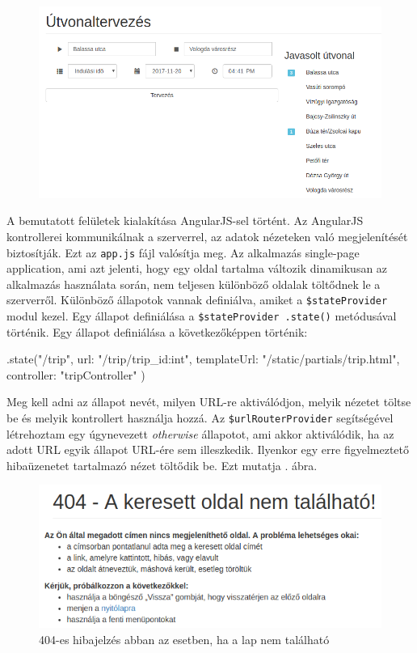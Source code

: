 \begin{figure}[h!]
\centering
\includegraphics[scale=0.5]{kepek/trip_planner.png}
\caption{}
\label{fig:trip_planner}
\end{figure}


A bemutatott felületek kialakítása AngularJS-sel történt. Az AngularJS kontrollerei kommunikálnak a szerverrel, az adatok nézeteken való megjelenítését biztosítják. Ezt az \texttt{app.js} fájl valósítja meg.
Az alkalmazás single-page application, ami azt jelenti, hogy egy oldal tartalma változik dinamikusan az alkalmazás használata során, nem teljesen különböző oldalak töltődnek le a szerverről. Különböző állapotok vannak definiálva, amiket a \texttt{\$stateProvider} modul kezel. Egy állapot definiálása a \texttt{\$stateProvider .state()} metódusával történik.
Egy állapot definiálása a következőképpen történik:
\begin{cpp}
.state("/trip", {
            url: "/trip/{trip_id:int}",
            templateUrl: "/static/partials/trip.html",
            controller: "tripController"
        })
\end{cpp}
Meg kell adni az állapot nevét, milyen URL-re aktiválódjon, melyik nézetet töltse be és melyik kontrollert használja hozzá.
Az \texttt{\$urlRouterProvider} segítségével létrehoztam egy úgynevezett \textit{otherwise} állapotot, ami akkor aktiválódik, ha az adott URL egyik állapot URL-ére sem illeszkedik. Ilyenkor egy erre figyelmeztető hibaüzenetet tartalmazó nézet töltődik be. Ezt mutatja . ábra.

\begin{figure}[h!]
\centering
\includegraphics[scale=0.7]{kepek/404.png}
\caption{404-es hibajelzés abban az esetben, ha a lap nem található}
\label{fig:404}
\end{figure}

